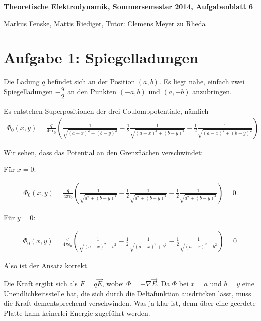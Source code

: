 \documentclass[a4paper,german,12pt,smallheadings]{scrartcl}
\begin{document}
\allowdisplaybreaks %
\begin{center}
\bfseries %
\sffamily %
\vspace{-40pt}
Theoretische Elektrodynamik, Sommersemester 2014, Aufgabenblatt 6

Markus Fenske, Mattis Riediger, Tutor: Clemens Meyer zu Rheda
\vspace{-10pt}
\end{center}

\section*{Aufgabe 1: Spiegelladungen}
Die Ladung $q$ befindet sich an der Position $(a,b)$. Es liegt nahe, einfach
zwei Spiegelladungen $-\dfrac{q}{2}$ an den Punkten $(-a, b)$ und $(a, -b)$
anzubringen.

Es entstehen Superpositionen der drei Coulombpotentiale, nämlich
\begin{align*}
  \Phi_0(x,y) = \frac{q}{4 \pi \epsilon_0} \left(
    \frac{1}{\sqrt{(a-x)^2 + (b-y)^2}} -
    \frac{1}{2} \frac{1}{\sqrt{(a+x)^2 + (b-y)^2}} -
    \frac{1}{2} \frac{1}{\sqrt{(a-x)^2 + (b+y)^2}}
  \right)
\end{align*}

Wir sehen, dass das Potential an den Grenzflächen verschwindet:

Für $x = 0$:

\begin{align*}
  \Phi_0(x,y) = \frac{q}{4 \pi \epsilon_0} \left(
    \frac{1}{\sqrt{a^2 + (b-y)^2}} -
    \frac{1}{2} \frac{1}{\sqrt{a^2 + (b-y)^2}} -
    \frac{1}{2} \frac{1}{\sqrt{a^2 + (b-y)^2}}
  \right) = 0
\end{align*}

Für $y = 0$:

\begin{align*}
  \Phi_0(x,y) = \frac{q}{4 \pi \epsilon_0} \left(
    \frac{1}{\sqrt{(a-x)^2 + b^2}} -
    \frac{1}{2} \frac{1}{\sqrt{(a-x)^2 + b^2}} -
    \frac{1}{2} \frac{1}{\sqrt{(a-x)^2 + b^2}}
  \right) = 0
\end{align*}

Also ist der Ansatz korrekt.

Die Kraft ergibt sich als $F = q \vec{E}$, wobei $\Phi = - \nabla \vec{E}$. Da
$\Phi$ bei $x=a$ und $b=y$ eine Unendlichkeitsstelle hat, die sich durch die
Deltafunktion ausdrücken lässt, muss die Kraft dementsprechend verschwinden.
Was ja klar ist, denn über eine geerdete Platte kann keinerlei Energie zugeführt
werden.
\end{document}
